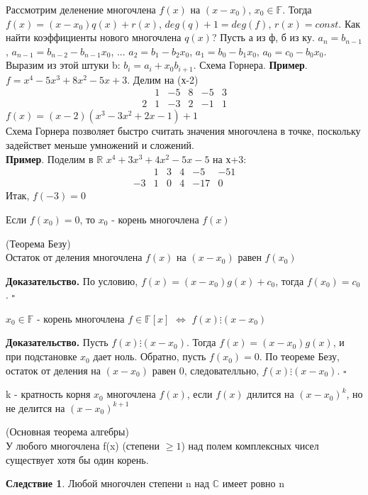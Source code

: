 Рассмотрим деленение многочлена $f(x)$ на $(x-x_0)$, $x_0\in\mathbb F$. Тогда
$f(x)=(x-x_0)q(x)+r(x)$, $deg(q)+1=deg(f)$, $r(x)=const$. Как найти коэффициенты
нового многочлена $q(x)$? Пусть а из ф, б из ку. $a_n=b_{n-1}$,
$a_{n-1}=b_{n-2}-b_{n-1}x_0$, ... $a_2=b_1-b_2x_0$, $a_1=b_0-b_1x_0$,
$a_0=c_0-b_0x_0$.
Выразим из этой штуки b: $b_i=a_i+x_0b_{i+1}$. Схема Горнера. 
\textbf{Пример}. $f=x^4-5x^3+8x^2-5x+3$. Делим на (х-2)
$$\begin{array}{cccccc}
&1&-5&8&-5&3\\2&1&-3&2&-1&1
\end{array}$$ $f(x)=(x-2)(x^3-3x^2+2x-1)+1$\\
Схема Горнера позволяет быстро считать значения многочлена в точке, 
поскольку задействет меньше умножений и сложений. \\
\textbf{Пример}. Поделим в $\mathbb R$ $x^4+3x^3+4x^2-5x-5$ на х+3:
$$\begin{array}{cccccc}
&1&3&4&-5&-51\\-3&1&0&4&-17&0
\end{array}$$ Итак, $f(-3)=0$
\begin{defin}
Если $f(x_0)=0$, то $x_0$ - корень многочлена $f(x)$
\end{defin}
\begin{theor}(Теорема Безу)\\
Остаток от деления многочлена $f(x)$ на $(x-x_0)$ равен $f(x_0)$
\end{theor}
\textbf{Доказательство.} По условию, $f(x)=(x-x_0)g(x)+c_0$, 
тогда $f(x_0)=c_0$. $\square$
\begin{theor}
$x_0\in\mathbb F$ - корень многочлена $f\in\mathbb F[x]$ 
$\Leftrightarrow$ $f(x)\vdots (x-x_0)$
\end{theor}
\textbf{Доказательство.} Пусть $f(x)\vdots (x-x_0)$. Тогда $f(x)=(x-x_0)g(x)$,
и при подстановке $x_0$ дает ноль. Обратно, пусть $f(x_0)=0$. По теореме Безу,
остаток от деления на $(x-x_0)$ равен 0, следователльно, $f(x)\vdots (x-x_0)$.
$\square$ 
\begin{defin}
k - кратность корня $x_0$ многочлена $f(x)$, если $f(x)$ днлится на $(x-x_0)^k$,
но не делится на $(x-x_0)^{k+1}$
\end{defin}
\begin{theor}
(Основная теорема алгебры)\\
У любого многочлена f(x) (степени $\geqslant1$) над полем комплексных чисел 
существует хотя бы один корень.  
\end{theor}
\textbf{Следствие 1}. Любой многочлен степени n над $\mathbb C$ имеет ровно n
